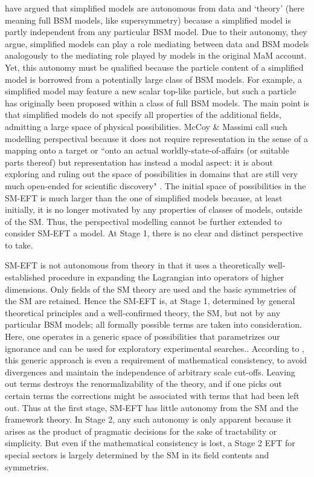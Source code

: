 \citet{mccoymassimi} have argued that simplified models are autonomous from data and `theory' (here meaning full BSM models, like supersymmetry) because a simplified model is partly independent from any particular BSM model. 
Due to their autonomy, they argue, simplified models can play a role mediating between data and BSM models analogously to the mediating role played by models in the original MaM account. 
Yet, this autonomy must be qualified because the particle content of a simplified model is borrowed from a potentially large class of BSM models. 
For example, a simplified model may feature a new scalar top-like particle, but such a particle has originally been proposed within a class of full BSM models. 
The main point is that simplified models do not specify all properties of the additional fields, admitting a large space of physical possibilities.
McCoy \& Massimi call such modelling perspectival because it does not require representation in the sense of a mapping onto a target or ``onto an actual worldly-state-of-affairs (or suitable parts thereof) but representation has instead a modal aspect: it is about exploring and ruling out the space of possibilities in domains that are still very much open-ended for scientific discovery" \citep[p.~338]{mccoymassimi}.
The initial space of possibilities in the SM-EFT is much larger than the one of simplified models because, at least initially, it is no longer motivated by any properties of classes of models, outside of the SM. 
Thus, the perspectival modelling cannot be further extended to consider SM-EFT a model.
At Stage 1, there is no clear and distinct perspective to take. 

SM-EFT is not autonomous from theory in that it uses a theoretically well-established procedure in expanding the Lagrangian into operators of higher dimensions. 
Only fields of the SM theory are used and the basic symmetries of the SM are retained. 
Hence the SM-EFT is, at Stage 1, determined by general theoretical principles and a well-confirmed theory, the SM, but not by any particular BSM models; all formally possible terms are taken into consideration.  
Here, one operates in a generic space of possibilities that parametrizes our ignorance and can be used for exploratory experimental searches.. 
According to \cite{wells2011}, this generic approach is even a requirement of mathematical consistency, to avoid divergences and maintain the independence of arbitrary scale cut-offs. 
Leaving out terms destroys the renormalizability of the theory, and if one picks out certain terms the corrections might be associated with terms that had been left out. 
Thus at the first stage, SM-EFT has little autonomy from the SM and the framework theory. 
In Stage 2, any such autonomy is only apparent because it arises as the product of pragmatic decisions for the sake of tractability or simplicity.
But even if the mathematical consistency is lost, a Stage 2 EFT for special sectors is largely determined by the SM in its field contents and symmetries. 


